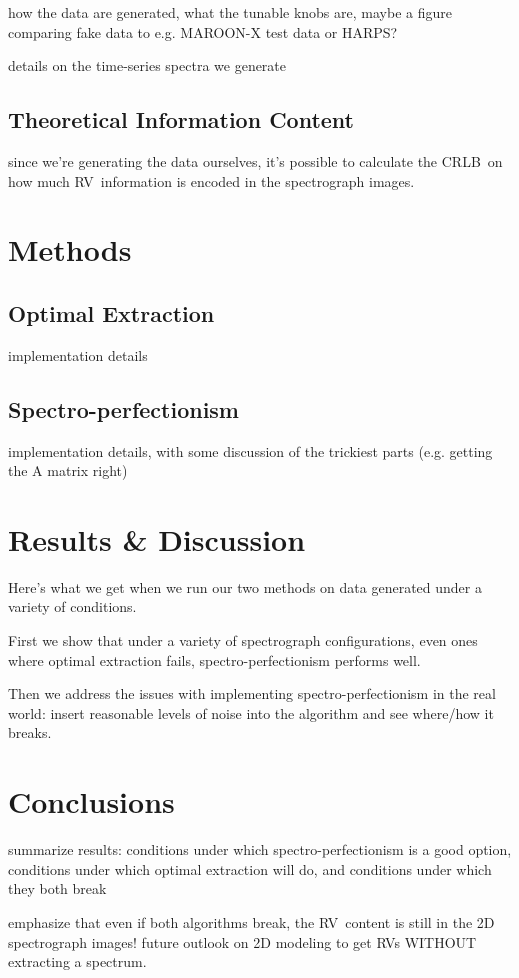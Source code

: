 \documentclass[modern]{aastex61}
\newcommand{\acronym}[1]{{\small{#1}}}
\newcommand{\RV}{\acronym{RV}}
\newcommand{\CRLB}{\acronym{CRLB}}
\begin{document}
how the data are generated, what the tunable knobs are, maybe a figure comparing fake data to e.g. MAROON-X test data or HARPS?




details on the time-series spectra we generate

\subsection{Theoretical Information Content}
since we're generating the data ourselves, it's possible to calculate the \CRLB\ on how much \RV\ information is encoded in the spectrograph images.

\section{Methods}
\subsection{Optimal Extraction}
implementation details

\subsection{Spectro-perfectionism}
implementation details, with some discussion of the trickiest parts (e.g. getting the A matrix right)


\section{Results \& Discussion}
Here's what we get when we run our two methods on data generated under a variety of conditions.

First we show that under a variety of spectrograph configurations, even ones where optimal extraction fails, spectro-perfectionism performs well.

Then we address the issues with implementing spectro-perfectionism in the real world: insert reasonable levels of noise into the algorithm and see where/how it breaks.

\section{Conclusions}

summarize results: conditions under which spectro-perfectionism is a good option, conditions under which optimal extraction will do, and conditions under which they both break

emphasize that even if both algorithms break, the \RV\ content is still in the 2D spectrograph images! future outlook on 2D modeling to get \RV s WITHOUT extracting a spectrum.




\end{document}
